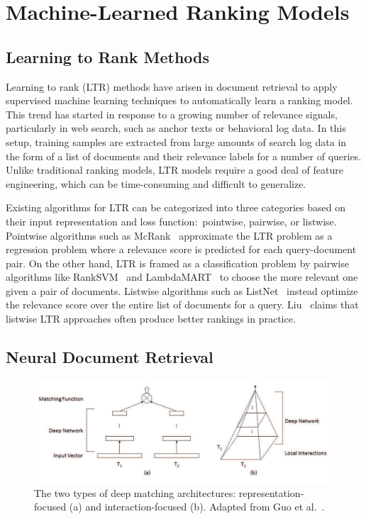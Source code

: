 \section{Machine-Learned Ranking Models}


\subsection{Learning to Rank Methods}

Learning to rank (LTR) methods have arisen in document retrieval to apply supervised machine learning techniques to automatically learn a ranking model.
This trend has started in response to a growing number of relevance signals, particularly in web search, such as anchor texts or behavioral log data.
In this setup, training samples are extracted from large amounts of search log data in the form of a list of documents and their relevance labels for a number of queries.
Unlike traditional ranking models, LTR models require a good deal of feature engineering, which can be time-consuming and difficult to generalize.

Existing algorithms for LTR can be categorized into three categories based on their input representation and loss function:\ pointwise, pairwise, or listwise.~\cite{liu2011learning}
Pointwise algorithms such as McRank~\cite{li2008mcrank} approximate the LTR problem as a regression problem where a relevance score is predicted for each query-document pair.
On the other hand, LTR is framed as a classification problem by pairwise algorithms like RankSVM~\cite{joachims2002optimizing} and LambdaMART~\cite{burges2010ranknet} to choose the more relevant one given a pair of documents.
Listwise algorithms such as ListNet~\cite{cao2007learning} instead optimize the relevance score over the entire list of documents for a query.
Liu~\cite{liu2011learning} claims that listwise LTR approaches often produce better rankings in practice.

\subsection{Neural Document Retrieval}
\label{neural-retrieval}

\begin{figure}[t!]
\centering
  \includegraphics[width=5in]{deep_matching.png}
\caption{The two types of deep matching architectures: representation-focused (a) and interaction-focused (b). Adapted from Guo et al.~\cite{guo2017drmm}.}
\label{fig:deep_matching}
\end{figure}


